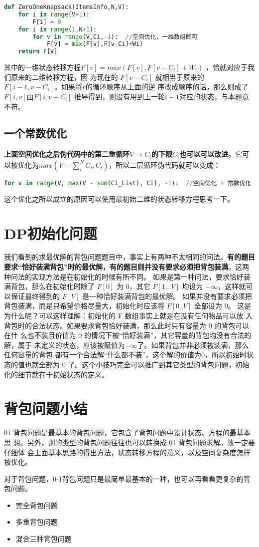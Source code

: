 \begin{lstlisting}[language=python, caption = 优化空间复杂度--二层循环倒序]
def ZeroOneKnapsack(ItemsInfo,N,V):
    for i in range(V+1):
        F[i] = 0
    for i in range(1,N+1):
        for v in range(V,Ci,-1):  //空间优化，一维数组即可
            F[v] = max(F[v],F[v-Ci]+Wi) 
    return F[V]
\end{lstlisting}

其中的一维状态转移方程$F[v] = max(F[v], F[v-C_i] + W_i)$ ，恰就对应于我们原来的二维转移方程，因
为现在的 $F[v-C_i]$ 就相当于原来的 $F[i-1, v-C_i]$。如果将$ v $的循环顺序从上面的逆
序改成顺序的话，那么则成了 $F[i, v] 由 F[i, v-C_i]$ 推导得到，则没有用到上一轮$i-1$对应的状态，与本题意不符。

\subsection{一个常数优化}
\textbf{上面空间优化之后伪代码中的第二重循环$V \rightarrow C_i$的下限$C_i$也可以可以改进}。它可以被优化为$max(V-\sum_{i}^{N}C_i,C_i)$，所以二层循环伪代码就可以变成：
\begin{lstlisting}[language=python, caption = 一个常数优化] 
    for v in range(V, max(V - sum(Ci_List), Ci), -1):  //空间优化 + 常数优化
\end{lstlisting}
这个优化之所以成立的原因可以使用最初始二维的状态转移方程思考一下。

\section{DP初始化问题}
我们看到的求最优解的背包问题题目中，事实上有两种不太相同的问法。\textbf{有的题目
要求“恰好装满背包”时的最优解，有的题目则并没有要求必须把背包装满}。这两种问法的实现方法是在初始化的时候有所不同。
如果是第一种问法，要求恰好装满背包，那么在初始化时除了 $F[0]$ 为 $0$，其它
$F[1...V]$ 均设为 $-\infty$，这样就可以保证最终得到的 $F[V]$ 是一种恰好装满背包的最优解。
如果并没有要求必须把背包装满，而是只希望价格尽量大，初始化时应该将 $F[0..V]$
全部设为 $0$。
这是为什么呢？可以这样理解：初始化的 F 数组事实上就是在没有任何物品可以放
入背包时的合法状态。如果要求背包恰好装满，那么此时只有容量为 $0$ 的背包可以在什
么也不装且价值为 $0$ 的情况下被“恰好装满”，其它容量的背包均没有合法的解，属于
未定义的状态，应该被赋值为$-\infty$了。如果背包并非必须被装满，那么任何容量的背包
都有一个合法解“什么都不装”，这个解的价值为$ 0$，所以初始时状态的值也就全部为 $0$
了。这个小技巧完全可以推广到其它类型的背包问题，初始化的细节就在于初始状态的定义。


\section{背包问题小结}
01 背包问题是最基本的背包问题，它包含了背包问题中设计状态、方程的最基本思
想。另外，别的类型的背包问题往往也可以转换成 01 背包问题求解。故一定要仔细体
会上面基本思路的得出方法，状态转移方程的意义，以及空间复杂度怎样被优化。

对于背包问题，0-1背包问题只是最简单最基本的一种，也可以再看看更复杂的背包问题。
\begin{itemize}
	\item 完全背包问题
	\item 多重背包问题
	\item 混合三种背包问题
\end{itemize}


